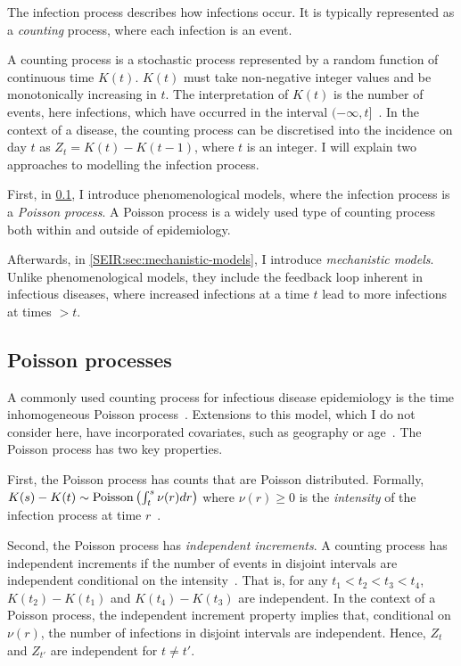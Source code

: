 \documentclass[thesis.tex]{subfiles}
\begin{document}
The infection process describes how infections occur.
It is typically represented as a \emph{counting} process, where each infection is an event.

A counting process is a stochastic process represented by a random function of continuous time $K(t)$.
$K(t)$ must take non-negative integer values and be monotonically increasing in $t$.
The interpretation of $K(t)$ is the number of events, here infections, which have occurred in the interval $(-\infty, t]$~\autocite[244]{yanDistribution}.
In the context of a disease, the counting process can be discretised into the incidence on day $t$ as $Z_t = K(t) - K(t-1)$, where $t$ is an integer.
I will explain two approaches to modelling the infection process.

First, in \cref{inc-prev:sec:poisson-process}, I introduce phenomenological models, where the infection process is a \emph{Poisson process}.
A Poisson process is a widely used type of counting process both within and outside of epidemiology.

Afterwards, in \cref{SEIR:sec:mechanistic-models}, I introduce \emph{mechanistic models}.
Unlike phenomenological models, they include the feedback loop inherent in infectious diseases, where increased infections at a time $t$ lead to more infections at times $> t$.

\subsection{Poisson processes} \label{inc-prev:sec:poisson-process}

A commonly used counting process for infectious disease epidemiology is the time inhomogeneous Poisson process~\autocite[e.g., in the context of HIV,][]{brookmeyerMethod,paganoHIV,rosenbergBackcalculation,brookmeyerBackcalculation}.
Extensions to this model, which I do not consider here, have incorporated covariates, such as geography or age~\autocite[e.g.][]{diggleModeling}.
The Poisson process has two key properties.

First, the Poisson process has counts that are Poisson distributed.
Formally, $K(s) - K(t) \sim \operatorname{Poisson}\left(\int^s_t \nu(r) dr \right)$ where $\nu(r) \geq 0$ is the \emph{intensity} of the infection process at time $r$~\autocite[244]{yanDistribution}.

Second, the Poisson process has \emph{independent increments}.
A counting process has independent increments if the number of events in disjoint intervals are independent conditional on the intensity~\autocite[244]{yanDistribution}.
That is, for any $t_1 < t_2 < t_3 < t_4$, $K(t_2) - K(t_1)$ and $K(t_4) - K(t_3)$ are independent.
In the context of a Poisson process, the independent increment property implies that, conditional on $\nu(r)$, the number of infections in disjoint intervals are independent.
Hence, $Z_t$ and $Z_{t'}$ are independent for $t \neq t'$.
\end{document}
